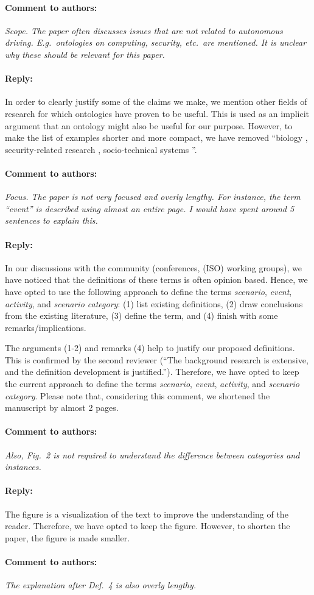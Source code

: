 \documentclass[10pt,final,a4paper,oneside,onecolumn]{article}
\newcommand{\toauthor}{\paragraph*{Comment to authors:} \itshape}
\newcommand{\fromauthor}{\paragraph*{Reply:} \normalfont}
\begin{document}
\toauthor Scope. The paper often discusses issues that are not related to autonomous driving. E.g.\ ontologies on computing, security, etc.\ are mentioned. It is unclear why these should be relevant for this paper.

\fromauthor In order to clearly justify some of the claims we make, we mention other fields of research for which ontologies have proven to be useful. This is used as an implicit argument that an ontology might also be useful for our purpose. However, to make the list of examples shorter and more compact, we have removed ``biology \autocite{gkoutos2004mouse}, security-related research \autocite{kim2005security}, socio-technical systems \autocite{vanDamPhDThesis2009}''.



\toauthor Focus. The paper is not very focused and overly lengthy. For instance, the term ``event'' is described using almost an entire page. I would have spent around 5 sentences to explain this.  

\fromauthor  In our discussions with the community (conferences, (ISO) working groups), we have noticed that the definitions of these terms is often opinion based. Hence, we have opted to use the following approach to define the terms \emph{scenario}, \emph{event}, \emph{activity}, and \emph{scenario category}: (1) list existing definitions, (2) draw conclusions from the existing literature, (3) define the term, and (4) finish with some remarks/implications. 

The arguments (1-2) and remarks (4) help to justify our proposed definitions. This is confirmed by the second reviewer (``The background research is extensive, and the definition development is justified.''). Therefore, we have opted to keep the current approach to define the terms \emph{scenario}, \emph{event}, \emph{activity}, and \emph{scenario category}. Please note that, considering this comment, we shortened the manuscript by almost 2 pages.



\toauthor Also, Fig.~2 is not required to understand the difference between categories and instances. 

\fromauthor The figure is a visualization of the text to improve the understanding of the reader. Therefore, we have opted to keep the figure. However, to shorten the paper, the figure is made smaller.



\toauthor The explanation after Def.~4 is also overly lengthy. 
\end{document}
